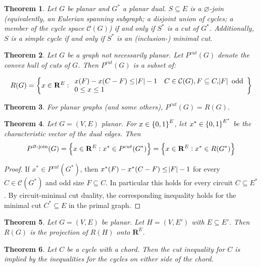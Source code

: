 \documentclass{article}
\newtheorem{theorem}{Theorem}
\begin{document}
\begin{theorem}
Let $G$ be planar and $G^*$ a planar dual. $S\subseteq E$ is a $\varnothing$-join (equivalently, an Eulerian spanning subgraph; a disjoint union of cycles; a member of the cycle space $\mathcal{C}(G)$) if and only if $S^*$ is a cut of $G^*$. Additionally,
$S$ is a simple cycle if and only if $S^*$ is an (inclusion-) minimal cut.
\end{theorem}

\begin{theorem}
Let $G$ be a graph not necessarily planar.
Let $P^{cut}(G)$ denote the convex hull of cuts of $G$. Then $P^{cut}(G)$ is a subset of:

$$ R(G) = \cbr{x\in \mathbf{R}^E: \begin{array}{ll}
x(F)-x(C-F)\leq \abs{F}-1 & C\in \mathcal{C}(G), F\subseteq C, \abs{F}\text{ odd} \\
0\leq x\leq 1
\end{array}}$$

\end{theorem}

\begin{theorem}
For planar graphs (and some others), $P^{cut}(G) = R(G)$.
\end{theorem}

\begin{theorem}
Let $G=(V,E)$ planar.
For $x\in \cbr{0,1}^E$, let $x^*\in\cbr{0,1}^{E^*}$ be the characteristic
vector of the dual edges. Then
$$P^{\text{$\varnothing$-join}}(G) = \cbr{x\in\mathbf{R}^E: x^*\in P^{cut}(G^*)} = \cbr{x\in\mathbf{R}^E: x^*\in R(G^*)}$$
\end{theorem}

\begin{proof}
If $x^* \in P^{cut}(G^*)$, then $x^*(F)-x^*(C-F)\leq \abs{F}-1$ for every $C\in \mathcal{C}(G^*)$ and odd size $F\subseteq C$. In particular this holds for every circuit $C\subseteq E^*$. By circuit-minimal cut duality, the corresponding inequality holds for the minimal cut $C^*\subseteq E$ in the primal graph.
\end{proof}


\begin{theorem}
Let $G=(V,E)$ be planar. Let $H=(V, E')$ with $E\subseteq E'$. Then $R(G)$ is the projection of $R(H)$ onto $\mathbf{R}^E$.
\end{theorem}

\begin{theorem}
Let $C$ be a cycle with a chord. Then the cut inequality for $C$ is implied by the inequalities for the cycles on either side of the chord. 
\end{theorem}
\end{document}
